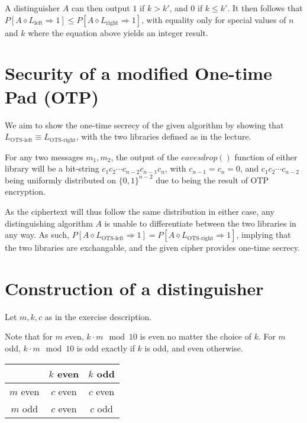 \documentclass[a4paper]{scrreprt}
\begin{document}
A distinguisher $A$ can then output $1$ if $k > k'$, and $0$ if $k \leq k'$. It
then follows that $P[A \diamond L_{\text{left}} \Rightarrow 1] \leq P[A
\diamond L_{\text{right}} \Rightarrow 1]$, with equality only for special
values of $n$ and $k$ where the equation above yields an integer result.

\section{Security of a modified One-time Pad (OTP)}

We aim to show the one-time secrecy of the given algorithm by showing that
$L_{\text{OTS-left}} \equiv L_{\text{OTS-right}}$, with the two libraries
defined as in the lecture.

For any two messages $m_1, m_2$, the output of the $eavesdrop()$ function of
either library will be a bit-string $c_1 c_2 \cdots c_{n-2} c_{n-1} c_n$, with
$c_{n - 1} = c_n = 0$, and $c_1 c_2 \cdots c_{n-2}$ being uniformly distributed
on $\{0, 1\}^{n-2}$ due to being the result of OTP encryption.

As the ciphertext will thus follow the same distribution in either case, any
distinguishing algorithm $A$ is unable to differentiate between the two
libraries in any way. As such, $P[A \diamond L_{\text{OTS-left}} \Rightarrow 1]
= P[A \diamond L_{\text{OTS-right}} \Rightarrow 1]$, implying that the two
libraries are exchangable, and the given cipher provides one-time secrecy.

\section{Construction of a distinguisher}

Let $m, k, c$ as in the exercise description.

Note that for $m$ even, $k \cdot m \mod 10$ is even no matter the choice of
$k$. For $m$ odd, $k \cdot m \mod 10$ is odd exactly if $k$ is odd, and even
otherwise.
\\

\begin{tabular}{ccc}
	\toprule
	         & $k$ even & $k$ odd \\
	\midrule
	$m$ even & $c$ even & $c$ even \\
	$m$ odd  & $c$ even & $c$ odd \\
	\bottomrule
\end{tabular}
\\
\end{document}
